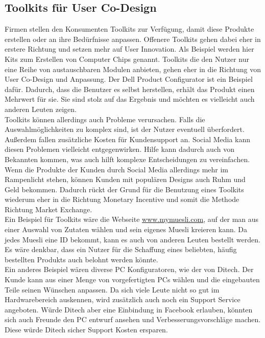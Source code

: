 \subsection{Toolkits f\"ur User Co-Design}
Firmen stellen den Konsumenten Toolkits zur Verf\"ugung, damit diese Produkte erstellen oder an ihre Bed\"urfnisse anpassen. Offenere Toolkits gehen dabei eher in erstere Richtung und setzen mehr auf User Innovation. Als Beispiel werden hier Kits zum Erstellen von Computer Chips genannt. Toolkits die den Nutzer nur eine Reihe von austauschbaren Modulen anbieten, gehen eher in die Richtung von User Co-Design und Anpassung. Der Dell Product Configurator ist ein Beispiel daf\"ur. Dadurch, dass die Benutzer es selbst herstellen, erh\"alt das Produkt einen Mehrwert f\"ur sie. Sie sind stolz auf das Ergebnis und m\"ochten es vielleicht auch anderen Leuten zeigen.\\
Toolkits k\"onnen allerdings auch Probleme verursachen. Falls die Auswahlm\"oglichkeiten zu komplex sind, ist der Nutzer eventuell \"uberfordert. Au\ss{}erdem fallen zus\"atzliche Kosten f\"ur Kundensupport an. Social Media kann diesen Problemen vielleicht entgegenwirken. Hilfe kann dadurch auch von Bekannten kommen, was auch hilft komplexe Entscheidungen zu vereinfachen.
Wenn die Produkte der Kunden durch Social Media allerdings mehr im Rampenlicht stehen, k\"onnen Kunden mit popul\"aren Designs auch Ruhm und Geld bekommen. Dadurch r\"uckt der Grund f\"ur die Benutzung eines Toolkits wiederum eher in die Richtung Monetary Incentive und somit die Methode Richtung Market Exchange.\\
Ein Beispiel f\"ur Toolkits w\"are die Webseite \url{www.mymuesli.com}, auf der man aus einer Auswahl von Zutaten w\"ahlen und sein eigenes Muesli kreieren kann. Da jedes Muesli eine ID bekommt, kann es auch von anderen Leuten bestellt werden. Es w\"are denkbar, dass ein Nutzer f\"ur die Schaffung eines beliebten, h\"aufig bestellten Produkts auch belohnt werden k\"onnte.\\
Ein anderes Beispiel w\"aren diverse PC Konfiguratoren, wie der von Ditech\cite{DITECH}. Der Kunde kann aus einer Menge von vorgefertigten PCs w\"ahlen und die eingebauten Teile seinen W\"unschen anpassen. Da sich viele Leute nicht so gut im Hardwarebereich auskennen, wird zus\"atzlich auch noch ein Support Service angeboten. W\"urde Ditech aber eine Einbindung in Facebook erlauben, k\"onnten sich auch Freunde den PC entwurf ansehen und Verbesserungsvorschl\"age machen. Diese w\"urde Ditech sicher Support Kosten ersparen.
